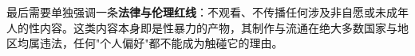 最后需要单独强调一条\textbf{法律与伦理红线}：不观看、不传播任何涉及非自愿或未成年人的性内容。这类内容本身即是性暴力的产物，其制作与流通在绝大多数国家与地区均属违法，任何"个人偏好"都不能成为触碰它的理由。
